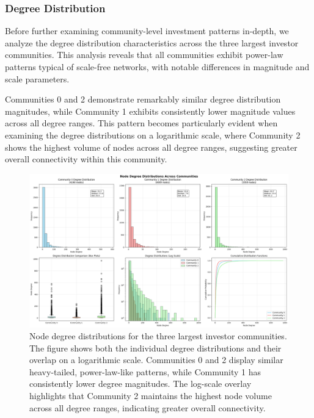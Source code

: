 \subsubsection{Degree Distribution}

Before further examining community-level investment patterns in-depth, we analyze the degree distribution characteristics across the three largest investor communities. This analysis reveals that all communities exhibit power-law patterns typical of scale-free networks, with notable differences in magnitude and scale parameters.

Communities 0 and 2 demonstrate remarkably similar degree distribution magnitudes, while Community 1 exhibits consistently lower magnitude values across all degree ranges. This pattern becomes particularly evident when examining the degree distributions on a logarithmic scale, where Community 2 shows the highest volume of nodes across all degree ranges, suggesting greater overall connectivity within this community.


\begin{figure}[ht]
\centering
\includegraphics[width=1\textwidth]{./assets/node-degree-distributions-across-communities.png}
\caption{Node degree distributions for the three largest investor communities. The figure shows both the individual degree distributions and their overlap on a logarithmic scale. Communities 0 and 2 display similar heavy-tailed, power-law-like patterns, while Community 1 has consistently lower degree magnitudes. The log-scale overlay highlights that Community 2 maintains the highest node volume across all degree ranges, indicating greater overall connectivity.}
\label{fig:node_degree_distributions}
\end{figure}

